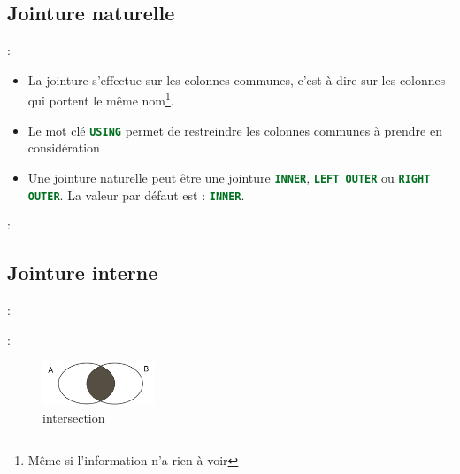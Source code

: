 \documentclass[10pt]{beamer}
\begin{document}
\subsection{Jointure naturelle}
\begin{frame}{\secname : \subsecname}
    \begin{itemize}
        \item   La jointure s'effectue sur les colonnes communes, c'est-à-dire sur les colonnes qui portent le même nom\footnote{Même si l'information n'a rien à voir}.
        \item Le mot clé \lstinline[language=sql]!USING! permet de restreindre les colonnes communes à prendre en considération
        \item Une jointure naturelle peut être une jointure \lstinline[language=sql]!INNER!, \lstinline[language=sql]!LEFT OUTER! ou \lstinline[language=sql]!RIGHT OUTER!. La valeur par défaut est : \lstinline[language=sql]!INNER!.
    \end{itemize}
    
\end{frame}

\begin{frame}{\secname : \subsecname}
    
\end{frame}


\subsection{Jointure interne}

\begin{frame}{\secname : \subsecname}
    
\end{frame}

\begin{frame}{\secname : \subsecname}
    
    \begin{figure}
        \begin{center}
            \includegraphics[width=0.3\textwidth]{../assets/img/intersection.pdf}
            \caption{intersection}
        \end{center}
    \end{figure}
\end{frame}
\end{document}
